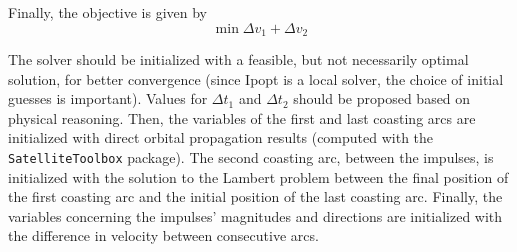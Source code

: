 Finally, the objective is given by
\begin{equation}
    \min \Delta v_1 + \Delta v_2
\end{equation}

The solver should be initialized with a feasible, but not necessarily optimal solution, for better convergence (since Ipopt is a local solver, the choice of initial guesses is important). Values for \(\Delta t_1\) and \(\Delta t_2\) should be proposed based on physical reasoning. Then, the variables of the first and last coasting arcs are initialized with direct orbital propagation results (computed with the \texttt{SatelliteToolbox} package). The second coasting arc, between the impulses, is initialized with the solution to the Lambert problem between the final position of the first coasting arc and the initial position of the last coasting arc. Finally, the variables concerning the impulses' magnitudes and directions are initialized with the difference in velocity between consecutive arcs.